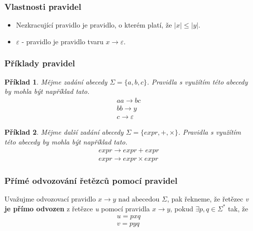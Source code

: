 \documentclass[10pt, a4paper, titlepage]{article}
\theoremstyle{note}
\newtheorem{priklad}{\textbf{Příklad}}
\begin{document}
\subsubsection{Vlastnosti pravidel}
\begin{itemize}
\item Nezkracující pravidlo je pravidlo, o kterém platí, že $|x| \leq |y| $.

\item $\varepsilon$ - pravidlo je pravidlo tvaru $x \rightarrow \varepsilon$.
\end{itemize}

\subsubsection{Příklady pravidel}
\begin{priklad}
Mějme zadání abecedy $\Sigma = \lbrace a,b,c \rbrace$. Pravidla s využítím této abecedy by mohla být například tato.
\begin{gather*}
aa \rightarrow bc \\
bb \rightarrow y \\
c \rightarrow \varepsilon
\end{gather*}
\end{priklad}

\begin{priklad}
Mějme další zadání abecedy $\Sigma = \lbrace expr, +, \times \rbrace$. Pravidla s využítím této abecedy by mohla být například tato.
\begin{gather*}
\textit{expr} \rightarrow \textit{expr} + \textit{expr} \\
\textit{expr} \rightarrow \textit{expr} \times \textit{expr}
\end{gather*}
\end{priklad}

\subsubsection{Přímé odvozování řetězců pomocí pravidel}
Uvažujme odvozovací pravidlo $ x \rightarrow y \text{ nad abecedou } \Sigma$, pak řekneme, že řetězec \emph{v} \textbf{je přímo odvozen}
z řetězce \emph{u} pomocí pravidla $ x \rightarrow y $, pokud $\exists p, q \in \Sigma^{*}$ tak, že
\begin{gather*}
u = p x q \\
v = p y q
\end{gather*}
\end{document}
